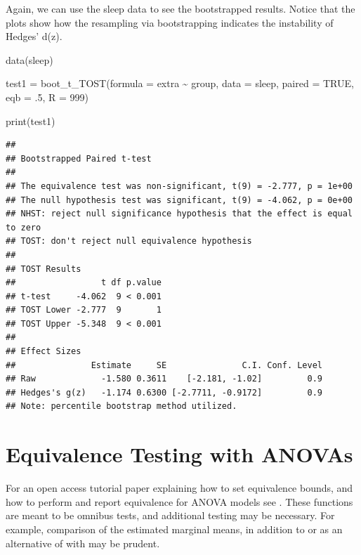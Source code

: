\documentclass[]{interact}
\theoremstyle{plain}%
\theoremstyle{definition}
\theoremstyle{remark}
\newenvironment{Shaded}{\begin{snugshade}}{\end{snugshade}}
\newcommand{\AttributeTok}[1]{\textcolor[rgb]{0.77,0.63,0.00}{#1}}
\newcommand{\ConstantTok}[1]{\textcolor[rgb]{0.00,0.00,0.00}{#1}}
\newcommand{\DecValTok}[1]{\textcolor[rgb]{0.00,0.00,0.81}{#1}}
\newcommand{\FunctionTok}[1]{\textcolor[rgb]{0.00,0.00,0.00}{#1}}
\newcommand{\NormalTok}[1]{#1}
\newcommand{\OtherTok}[1]{\textcolor[rgb]{0.56,0.35,0.01}{#1}}
\newcommand{\SpecialCharTok}[1]{\textcolor[rgb]{0.00,0.00,0.00}{#1}}
\newcommand{\StringTok}[1]{\textcolor[rgb]{0.31,0.60,0.02}{#1}}
\begin{document}
Again, we can use the sleep data to see the bootstrapped results. Notice
that the plots show how the resampling via bootstrapping indicates the
instability of Hedges' d(z).

\begin{Shaded}
\begin{Highlighting}[]
\FunctionTok{data}\NormalTok{(}\StringTok{\textquotesingle{}sleep\textquotesingle{}}\NormalTok{)}

\NormalTok{test1 }\OtherTok{=} \FunctionTok{boot\_t\_TOST}\NormalTok{(}\AttributeTok{formula =}\NormalTok{ extra }\SpecialCharTok{\textasciitilde{}}\NormalTok{ group,}
                    \AttributeTok{data =}\NormalTok{ sleep,}
                    \AttributeTok{paired =} \ConstantTok{TRUE}\NormalTok{,}
                    \AttributeTok{eqb =}\NormalTok{ .}\DecValTok{5}\NormalTok{,}
                    \AttributeTok{R =} \DecValTok{999}\NormalTok{)}


\FunctionTok{print}\NormalTok{(test1)}
\end{Highlighting}
\end{Shaded}

\begin{verbatim}
## 
## Bootstrapped Paired t-test
## 
## The equivalence test was non-significant, t(9) = -2.777, p = 1e+00
## The null hypothesis test was significant, t(9) = -4.062, p = 0e+00
## NHST: reject null significance hypothesis that the effect is equal to zero 
## TOST: don't reject null equivalence hypothesis
## 
## TOST Results 
##                 t df p.value
## t-test     -4.062  9 < 0.001
## TOST Lower -2.777  9       1
## TOST Upper -5.348  9 < 0.001
## 
## Effect Sizes 
##               Estimate     SE               C.I. Conf. Level
## Raw             -1.580 0.3611    [-2.181, -1.02]         0.9
## Hedges's g(z)   -1.174 0.6300 [-2.7711, -0.9172]         0.9
## Note: percentile bootstrap method utilized.
\end{verbatim}

\hypertarget{equivalence-testing-with-anovas}{%
\section{Equivalence Testing with
ANOVAs}\label{equivalence-testing-with-anovas}}

For an open access tutorial paper explaining how to set equivalence
bounds, and how to perform and report equivalence for ANOVA models see
\citet{Campbell_2021}. These functions are meant to be omnibus tests,
and additional testing may be necessary. For example, comparison of the
estimated marginal means, in addition to or as an alternative of with
may be prudent.
\end{document}

